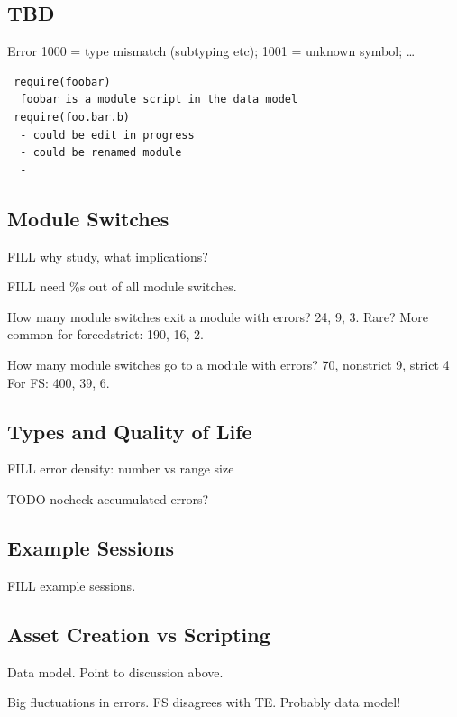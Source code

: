 \documentclass[english,submission,cleveref]{programming}
\begin{document}
\subsection{TBD}

Error 1000 = type mismatch (subtyping etc);
1001 = unknown symbol;
\ldots



\begin{verbatim}
 require(foobar)
  foobar is a module script in the data model
 require(foo.bar.b)
  - could be edit in progress
  - could be renamed module
  - 
\end{verbatim}


\subsection{Module Switches}

FILL why study, what implications?

FILL need \%s out of all module switches.

How many module switches exit a module with errors?
\mnocheck{} 24, \mnonstrict{} 9, \mstrict{} 3.
Rare?
More common for forcedstrict:
 \mnocheck{} 190, \mnonstrict{} 16, \mstrict{} 2.

How many module switches go to a module with errors?
\mnocheck{} 70, nonstrict 9, strict 4
For FS: \mnocheck{} 400, \mnonstrict{} 39, \mstrict{} 6.


\subsection{Types and Quality of Life}

FILL error density: number vs range size

TODO nocheck accumulated errors?


\subsection{Example Sessions}

FILL example sessions.


\subsection{Asset Creation vs Scripting}

Data model. Point to discussion above.

Big fluctuations in errors.
FS disagrees with TE.
Probably data model!
\end{document}
